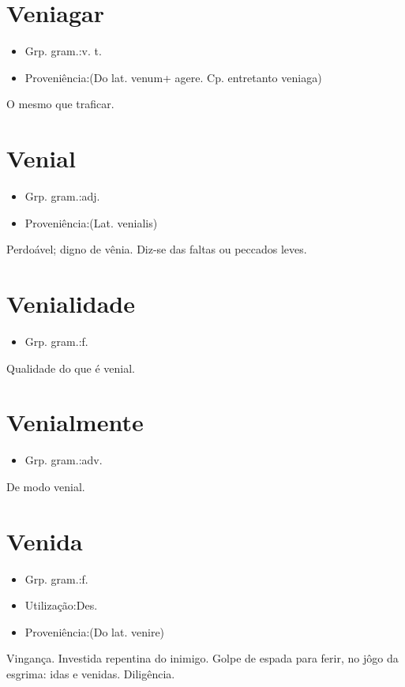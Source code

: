 \documentclass{article}
\begin{document}
\section{Veniagar}
\begin{itemize}
\item {Grp. gram.:v. t.}
\end{itemize}
\begin{itemize}
\item {Proveniência:(Do lat. \textunderscore venum\textunderscore  + \textunderscore agere\textunderscore . Cp. entretanto \textunderscore veniaga\textunderscore )}
\end{itemize}
O mesmo que \textunderscore traficar\textunderscore .
\section{Venial}
\begin{itemize}
\item {Grp. gram.:adj.}
\end{itemize}
\begin{itemize}
\item {Proveniência:(Lat. \textunderscore venialis\textunderscore )}
\end{itemize}
Perdoável; digno de vênia.
Diz-se das faltas ou peccados leves.
\section{Venialidade}
\begin{itemize}
\item {Grp. gram.:f.}
\end{itemize}
Qualidade do que é venial.
\section{Venialmente}
\begin{itemize}
\item {Grp. gram.:adv.}
\end{itemize}
De modo venial.
\section{Venida}
\begin{itemize}
\item {Grp. gram.:f.}
\end{itemize}
\begin{itemize}
\item {Utilização:Des.}
\end{itemize}
\begin{itemize}
\item {Proveniência:(Do lat. \textunderscore venire\textunderscore )}
\end{itemize}
Vingança.
Investida repentina do inimigo.
Golpe de espada para ferir, no jôgo da esgrima: \textunderscore idas e venidas\textunderscore .
Diligência.
\end{document}
